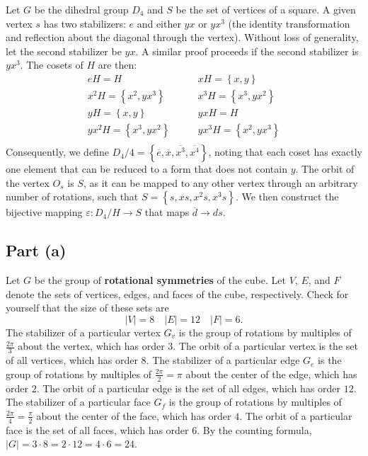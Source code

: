 \documentclass{article}
\begin{document}
\clearpage

Let $G$ be the dihedral group $D_4$ and $S$ be the set of vertices of a square. A given vertex $s$ has two stabilizers: $e$ and either $yx$ or $yx^3$ (the identity transformation and reflection about the diagonal through the vertex). Without loss of generality, let the second stabilizer be $yx$. A similar proof proceeds if the second stabilizer is $yx^3$. The cosets of $H$ are then:
\begin{equation}
    \begin{split}
        eH = H \quad & \quad xH = \left\{x, y\right\} \\
        x^2H = \left\{x^2, yx^3\right\} \quad & \quad x^3H = \left\{x^3, yx^2\right\} \\
        yH = \left\{x, y\right\} \quad & \quad yxH = H \\
        yx^2H = \left\{x^3, yx^2\right\} \quad & \quad yx^3H = \left\{x^2, yx^3\right\} \\
    \end{split}
\end{equation}
Consequently, we define $D_4 / 4 = \left\{\overline{e}, \overline{x}, \overline{x^3}, \overline{x^4}\right\}$, noting that each coset has exactly one element that can be reduced to a form that does not contain $y$. The orbit of the vertex $O_s$ is $S$, as it can be mapped to any other vertex through an arbitrary number of rotations,  such that $S = \left\{s, xs, x^2s, x^3s\right\}$. We then construct the bijective mapping $\varepsilon : D_4 / H \to S$ that maps $\overline{d} \to ds$.

\clearpage

\subsection*{Part (a)}
Let $G$ be the group of \textbf{rotational symmetries} of the cube. Let $V$, $E$, and $F$ denote the sets of vertices, edges, and faces of the cube, respectively. Check for yourself that the size of these sets are 
\begin{equation}
    |V| = 8 \quad |E| = 12 \quad |F| = 6.
\end{equation}
The stabilizer of a particular vertex $G_v$ is the group of rotations by multiples of $\frac{2\pi}{3}$ about the vertex, which has order $3$. The orbit of a particular vertex is the set of all vertices, which has order $8$. The stabilizer of a particular edge $G_e$ is the group of rotations by multiples of $\frac{2\pi}{2} = \pi$ about the center of the edge, which has order $2$. The orbit of a particular edge is the set of all edges, which has order $12$. The stabilizer of a particular face $G_f$ is the group of rotations by multiples of $\frac{2\pi}{4} = \frac{\pi}{2}$ about the center of the face, which has order $4$. The orbit of a particular face is the set of all faces, which has order $6$. By the counting formula, $|G| = 3 \cdot 8 = 2 \cdot 12 = 4 \cdot 6 = 24$.
\end{document}

